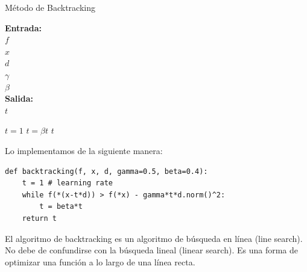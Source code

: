 \begin{algorithm}[H]
	\caption{Método de Backtracking}
	\hspace*{\algorithmicindent}\textbf{Entrada: } \\
	\hspace*{\algorithmicindent*2} $f$  \\
	\hspace*{\algorithmicindent*2} $x$  \\
	\hspace*{\algorithmicindent*2} $d$  \\
	\hspace*{\algorithmicindent*2} $\gamma$  \\
	\hspace*{\algorithmicindent*2} $\beta$  \\
	\hspace*{\algorithmicindent}\textbf{Salida:} \\
	\hspace*{\algorithmicindent*2} $t$ 
	\begin{algorithmic}
		\Procedure {}{}
		\State $t = 1$ 
			\State $t = \beta t$
		\EndWhile
		\State \Return $t$ 
		\EndProcedure
	\end{algorithmic}
\end{algorithm}

Lo implementamos de la siguiente manera:\\

\begin{verbatim}
def backtracking(f, x, d, gamma=0.5, beta=0.4):
	t = 1 # learning rate
	while f(*(x-t*d)) > f(*x) - gamma*t*d.norm()^2:
		t = beta*t
	return t
\end{verbatim}

El algoritmo de backtracking es un algoritmo de búsqueda en línea (line search). No debe de confundirse con la búsqueda lineal (linear search). Es una forma de optimizar una función a lo largo de una línea recta. 

